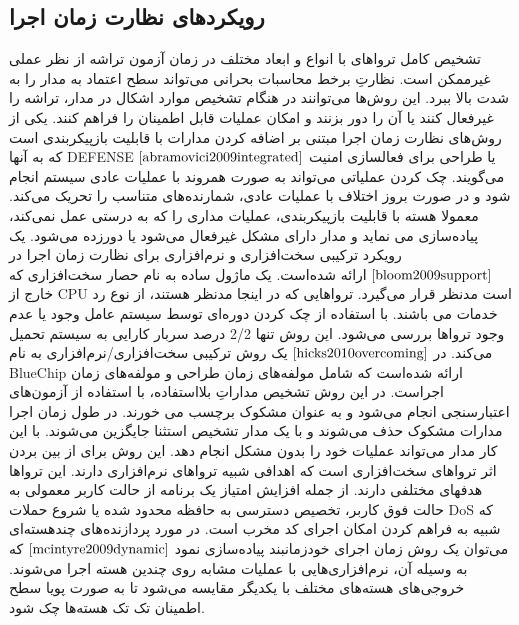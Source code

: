 \subsection{رویکردهای نظارت زمان اجرا}
تشخیص کامل تروا‌های با انواع و ابعاد مختلف در زمان آزمون تراشه از نظر عملی غیرممکن است. نظارتِ برخط محاسبات بحرانی می‌تواند سطح اعتماد به مدار را به شدت بالا ببرد. این روش‌ها می‌توانند در هنگام تشخیص موارد اشکال در مدار، تراشه را غیرفعال کنند یا آن را دور بزنند و امکان عملیات قابل اطمینان را فراهم کنند. یکی از روش‌های نظارت زمان اجرا مبتنی بر اضافه کردن مدارات با قابلیت بازپیکربندی است که به آنها DEFENSE یا طراحی برای فعالسازی امنیت $\cite{abramovici2009integrated}$ می‌گویند. چک کردن عملیاتی می‌تواند به صورت همروند با عملیات عادی سیستم انجام شود و در صورت بروز اختلاف با عملیات عادی، شمارنده‌های متناسب را تحریک می‌کند. معمولا هسته با قابلیت بازپیکربندی، عملیات مداری را که به درستی عمل نمی‌کند، پیاده‌سازی می نماید و مدار دارای مشکل غیرفعال می‌شود یا دورزده می‌شود.
یک رویکرد ترکیبی سخت‌افزاری و نرم‌افزاری برای نظارت زمان اجرا در $\cite{bloom2009support}$ ارائه شده‌است. یک ماژول ساده به نام حصار سخت‌افزاری که خارج از CPU است مدنظر قرار می‌گیرد. تروا‌هایی که در اینجا مدنظر هستند، از نوع رد خدمات می باشند. با استفاده از چک کردن دوره‌ای توسط سیستم عامل وجود یا عدم وجود تروا‌ها بررسی می‌شود. این روش تنها 2/2 درصد سربار کارایی به سیستم تحمیل می‌کند.
در $\cite{hicks2010overcoming}$ یک روش ترکیبی سخت‌افزاری/نرم‌افزاری به نام BlueChip ارائه شده‌است که شامل مولفه‌های زمان طراحی و مولفه‌های زمان اجراست. در این روش تشخیص مداراتِ بلااستفاده، با استفاده از آزمون‌های اعتبارسنجی انجام می‌شود و به عنوان مشکوک برچسب می خورند. در طول زمان اجرا مدارات مشکوک حذف می‌شوند و با یک مدار تشخیص استثنا جایگزین می‌شوند. با این کار مدار می‌تواند عملیات خود را بدون مشکل انجام دهد. این روش برای از بین بردن اثر تروا‌های سخت‌افزاری است که اهدافی شبیه تروا‌های نرم‌افزاری دارند. این تروا‌ها هدفهای مختلفی دارند. از جمله افزایش امتیاز یک برنامه از حالت کاربر معمولی به حالت فوق کاربر، تخصیص دسترسی به حافظه محدود شده یا شروع حملات DoS که شبیه به فراهم کردن امکان اجرای کد مخرب است.
در مورد پردازنده‌ها‌‌ی چندهسته‌ای می‌توان یک روش زمان اجرای خودزمانبند پیاده‌سازی نمود $\cite{mcintyre2009dynamic}$ که به وسیله آن، نرم‌افزاری‌ها‌‌یی با عملیات مشابه روی چندین هسته اجرا می‌شوند. خروجی‌های هسته‌های مختلف با یکدیگر مقایسه می‌شود تا به صورت پویا سطح اطمینان تک تک هسته‌ها چک شود.
